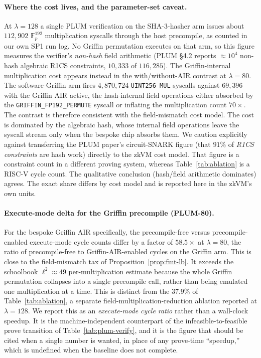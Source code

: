 \paragraph{Where the cost lives, and the parameter-set caveat.}
At $\lambda=128$ a single PLUM verification on the SHA-3-hasher arm issues about $112{,}902$ $\mathbb{F}_p^{192}$ multiplication syscalls through the host precompile, as counted in our own SP1 run log. No Griffin permutation executes on that arm, so this figure measures the verifier's \emph{non-hash} field arithmetic (PLUM \S4.2 reports $\approx 10^4$ non-hash algebraic R1CS constraints, $10{,}333$ of $116{,}285$). The Griffin-internal multiplication cost appears instead in the with/without-AIR contrast at $\lambda=80$. The software-Griffin arm fires $4{,}870{,}724$ \texttt{UINT256\_MUL} syscalls against $69{,}396$ with the Griffin AIR active, the hash-internal field operations either absorbed by the \texttt{GRIFFIN\_FP192\_PERMUTE} syscall or inflating the multiplication count $70\times$. The contrast is therefore consistent with the field-mismatch cost model. The cost is dominated by the algebraic hash, whose internal field operations leave the syscall stream only when the bespoke chip absorbs them. We caution explicitly against transferring the PLUM paper's circuit-SNARK figure (that $91\%$ of \emph{R1CS constraints} are hash work) directly to the zkVM cost model. That figure is a constraint count in a different proving system, whereas Table~\ref{tab:ablation} is a RISC-V cycle count. The qualitative conclusion (hash/field arithmetic dominates) agrees. The exact share differs by cost model and is reported here in the zkVM's own units.

\paragraph{Execute-mode delta for the Griffin precompile (PLUM-80).}
For the bespoke Griffin AIR specifically, the precompile-free versus precompile-enabled execute-mode cycle counts differ by a factor of $58.5\times$ at $\lambda=80$, the ratio of precompile-free to Griffin-AIR-enabled cycles on the Griffin arm. This is close to the field-mismatch tax of Proposition~\ref{prop:fmt-lb}. It exceeds the schoolbook $\ell^2\approx 49$ per-multiplication estimate because the whole Griffin permutation collapses into a single precompile call, rather than being emulated one multiplication at a time. This is distinct from the $37.9\%$ of Table~\ref{tab:ablation}, a separate field-multiplication-reduction ablation reported at $\lambda=128$. 
We report this as an \emph{execute-mode cycle ratio} rather than a wall-clock speedup. It is the machine-independent counterpart of the infeasible-to-feasible prove transition of Table~\ref{tab:plum-verify}, and it is the figure that should be cited when a single number is wanted, in place of any prove-time ``speedup,'' which is undefined when the baseline does not complete.

